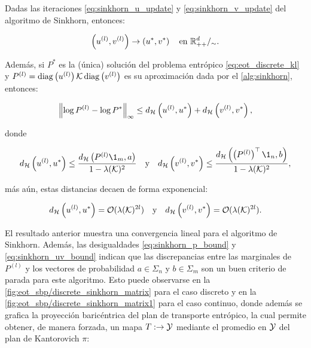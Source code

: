 \begin{teo}
	\label{teo:sinkhorn_convergence}
	Dadas las iteraciones \eqref{eq:sinkhorn_u_update} y \eqref{eq:sinkhorn_v_update} del algoritmo de Sinkhorn, entonces:

	\begin{equation*}
		\left(u^{(l)},v^{(l)}\right) \to \left(u^*,v^*\right)
		\quad\text{en }\mathbb{R}^{d}_{++}/_\sim.
	\end{equation*}

	Además, si $P^*$ es la (única) solución del problema entrópico \eqref{eq:eot_discrete_kl} y $P^{(l)} = \operatorname{diag}\left(u^{(l)}\right)\mathcal{K}\operatorname{diag}\left(v^{(l)}\right)$ es su aproximación dada por el \autoref{alg:sinkhorn}, entonces:

	\begin{equation}
		\label{eq:sinkhorn_p_bound}
		\left\lVert \log P^{(l)} - \log P^* \right\rVert_\infty \leq d_{\mathcal{H}}\left(u^{(l)},u^*\right) + d_{\mathcal{H}}\left(v^{(l)},v^*\right),
	\end{equation}

	donde

	\begin{equation}
		\label{eq:sinkhorn_uv_bound}
		\hmetric{u^{(l)}}{u^*}\leq\frac{\hmetric{P^{(l)}\1_m}{a}}{1-\lambda(\gibbs)^2}
		\quad\text{y}\quad
		\hmetric{v^{(l)}}{v^*}\leq \frac{\hmetric{\parent{P^{(l)}}^\top\1_n}{b}}{1-\lambda(\gibbs)^2},
	\end{equation}

	más aún, estas distancias decaen de forma exponencial:

	\begin{equation*}
		d_{\mathcal{H}}\left(u^{(l)},u^*\right) = \mathcal{O}(\lambda(\mathcal{K})^{2l})
		\quad\text{y}\quad
		d_{\mathcal{H}}\left(v^{(l)},v^*\right) = \mathcal{O}(\lambda(\mathcal{K})^{2l}).
	\end{equation*}

\end{teo}

El resultado anterior muestra una convergencia lineal para el algoritmo de Sinkhorn. Además, las desigualdades \eqref{eq:sinkhorn_p_bound} y \eqref{eq:sinkhorn_uv_bound} indican que las discrepancias entre las marginales de $P^{(l)}$ y los vectores de probabilidad $a\in\Sigma_n$ y $b\in\Sigma_m$ son un buen criterio de parada para este algoritmo. Esto puede observarse en la \autoref{fig:eot_sbp/discrete_sinkhorn_matrix} para el caso discreto y en la \autoref{fig:eot_sbp/discrete_sinkhorn_matrix1} para el caso continuo, donde además se grafica la proyección baricéntrica del plan de transporte entrópico, la cual permite obtener, de manera forzada, un mapa $T:\to\mathcal{Y}$ mediante el promedio en $\mathcal{Y}$ del plan de Kantorovich $\pi$:

